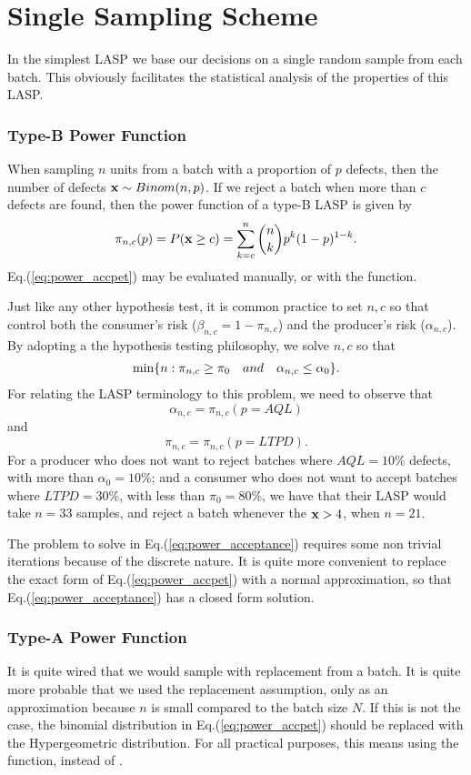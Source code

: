 \section{Single Sampling Scheme}
In the simplest LASP we base our decisions on a single random sample from each batch.
This obviously facilitates the statistical analysis of the properties of this LASP.

\subsubsection{Type-B Power Function}

When sampling $n$ units from a batch with a proportion of $p$ defects, then the number of defects $\mathbf{x} \sim Binom(n,p)$.
If we reject a batch when more than $c$ defects are found, then the power function of a type-B LASP is given by
\begin{align}
\label{eq:power_accpet}
	\pi_{n,c}(p)=P(\mathbf{x} \geq c)= \sum_{k=c}^n \binom{n}{k} p^k (1-p)^{1-k} .
\end{align}
Eq.(\ref{eq:power_accpet}) may be evaluated manually, or with the  \R function. 

Just like any other hypothesis test, it is common practice to set $n,c$ so that control both the consumer's risk ($\beta_{n,c}=1-\pi_{n,c}$) and the producer's risk ($\alpha_{n,c}$).
By adopting a the hypothesis testing philosophy, we solve $n,c$ so that 
\begin{align}
\label{eq:power_acceptance}
 \min \{ n : \pi_{n,c}\geq \pi_0 \quad and \quad \alpha_{n,c}\leq \alpha_0  \}.
\end{align}
For relating the LASP terminology to this problem, we need to observe that $$\alpha_{n,c}=\pi_{n,c}(p=AQL)$$ and $$\pi_{n,c}=\pi_{n,c}(p=LTPD).$$
For a producer who does not want to reject batches where $AQL=10\%$ defects, with more than $\alpha_0=10\%$; 
and a consumer who does not want to accept batches where $LTPD=30\%$, with less than $\pi_0=80\%$, 
we have that their LASP would take $n=33$ samples, and reject a batch whenever the $\mathbf{x}>4$, when $n=21$.
\begin{remark}
The problem to solve in Eq.(\ref{eq:power_acceptance}) requires some non trivial iterations because of the discrete nature.
It is quite more convenient to replace the exact form of Eq.(\ref{eq:power_accpet}) with a normal approximation, so that Eq.(\ref{eq:power_acceptance}) has a closed form solution. 
\end{remark}



\subsubsection{Type-A Power Function}
It is quite wired that we would sample with replacement from a batch.
It is quite more probable that we used the replacement assumption, only as an approximation because $n$ is small compared to the batch size $N$. 
If this is not the case, the binomial distribution in Eq.(\ref{eq:power_accpet}) should be replaced with the Hypergeometric distribution. 
For all practical purposes, this means using the  \R function, instead of .
